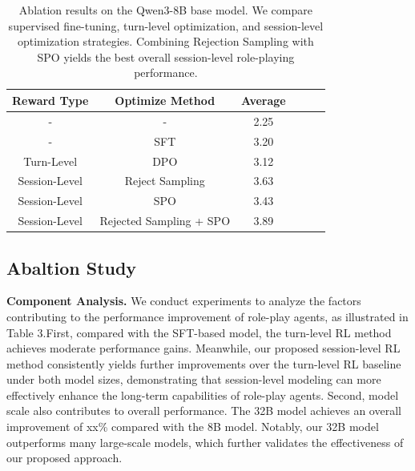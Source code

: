 \begin{table}[t]
\centering
\small  %
\caption{Ablation results on the Qwen3-8B base model. We compare supervised fine-tuning, turn-level optimization, and session-level optimization strategies. Combining Rejection Sampling with SPO yields the best overall session-level role-playing performance.}
\label{tab:model_evaluation}
\begin{tabular}{cccccc}  %
\toprule
Reward Type & Optimize Method & Average  \\
\midrule
- & - & 2.25  \\
- & SFT  & 3.20 \\
Turn-Level & DPO & 3.12 \\
Session-Level & Reject Sampling & 3.63  \\
Session-Level & SPO & 3.43 \\
Session-Level & Rejected Sampling + SPO & 3.89\\

\bottomrule
\end{tabular}
\end{table}

\subsection{Abaltion Study}
\textbf{Component Analysis.}
We conduct experiments to analyze the factors contributing to the performance improvement of role-play agents, as illustrated in Table 3.First, compared with the SFT-based model, the turn-level RL method achieves moderate performance gains. Meanwhile, our proposed session-level RL method consistently yields further improvements over the turn-level RL baseline under both model sizes, demonstrating that session-level modeling can more effectively enhance the long-term capabilities of role-play agents.
Second, model scale also contributes to overall performance. The 32B model achieves an overall improvement of xx\% compared with the 8B model. Notably, our 32B model outperforms many large-scale models, which further validates the effectiveness of our proposed approach.

